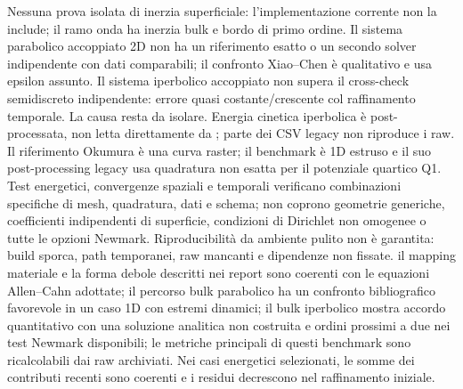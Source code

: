 {}
\markdownRendererSectionEnd \markdownRendererSectionBegin
{}\markdownRendererInterblockSeparator
{}\markdownRendererOlBeginTight
{}Nessuna prova isolata di inerzia superficiale: l’implementazione corrente non la include; il ramo onda ha inerzia bulk e bordo di primo ordine.\markdownRendererOlItemEnd 
{}Il sistema parabolico accoppiato 2D non ha un riferimento esatto o un secondo solver indipendente con dati comparabili; il confronto Xiao–Chen è qualitativo e usa epsilon assunto.\markdownRendererOlItemEnd 
{}Il sistema iperbolico accoppiato non supera il cross-check semidiscreto indipendente: errore quasi costante/crescente col raffinamento temporale. La causa resta da isolare.\markdownRendererOlItemEnd 
{}Energia cinetica iperbolica è post-processata, non letta direttamente da ; parte dei CSV legacy non riproduce i raw.\markdownRendererOlItemEnd 
{}Il riferimento Okumura è una curva raster; il benchmark è 1D estruso e il suo post-processing legacy usa quadratura non esatta per il potenziale quartico Q1.\markdownRendererOlItemEnd 
{}Test energetici, convergenze spaziali e temporali verificano combinazioni specifiche di mesh, quadratura, dati e schema; non coprono geometrie generiche, coefficienti indipendenti di superficie, condizioni di Dirichlet non omogenee o tutte le opzioni Newmark.\markdownRendererOlItemEnd 
{}Riproducibilità da ambiente pulito non è garantita: build sporca, path temporanei, raw mancanti e dipendenze non fissate.\markdownRendererOlItemEnd 
\markdownRendererOlEndTight \markdownRendererInterblockSeparator
{}
\markdownRendererSectionEnd \markdownRendererSectionBegin
{}\markdownRendererInterblockSeparator
{} il mapping materiale e la forma debole descritti nei report sono coerenti con le equazioni Allen–Cahn adottate; il percorso bulk parabolico ha un confronto bibliografico favorevole in un caso 1D con estremi dinamici; il bulk iperbolico mostra accordo quantitativo con una soluzione analitica non costruita e ordini prossimi a due nei test Newmark disponibili; le metriche principali di questi benchmark sono ricalcolabili dai raw archiviati. Nei casi energetici selezionati, le somme dei contributi recenti sono coerenti e i residui decrescono nel raffinamento iniziale.\markdownRendererInterblockSeparator
